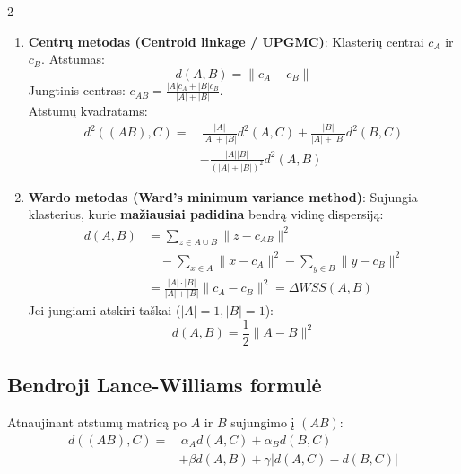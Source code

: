 \documentclass[9pt,a4paper]{article}
\begin{document}
\begin{multicols*}{2}
\begin{enumerate}
    \item \textbf{Centrų metodas (Centroid linkage / UPGMC)}:
    Klasterių centrai $c_A$ ir $c_B$. Atstumas:
    \begin{equation*}
        d(A, B) = \|c_A - c_B\|
    \end{equation*}
    Jungtinis centras: $c_{AB} = \frac{|A|c_A + |B|c_B}{|A| + |B|}$.\\
    Atstumų kvadratams:
    \begin{align*}
        d^2((AB), C) = &\,\frac{|A|}{|A|+|B|}d^2(A,C) + \frac{|B|}{|A|+|B|}d^2(B,C) \\
        & - \frac{|A||B|}{(|A|+|B|)^2}d^2(A,B)
    \end{align*}

    \item \textbf{Wardo metodas (Ward's minimum variance method)}:
    Sujungia klasterius, kurie \textbf{mažiausiai padidina} bendrą vidinę dispersiją:
    \begin{align*}
        d(A, B) &= \sum_{z \in A \cup B} \|z - c_{AB}\|^2 \\
        &\quad - \sum_{x \in A} \|x - c_A\|^2 - \sum_{y \in B} \|y - c_B\|^2 \\
        &= \frac{|A| \cdot |B|}{|A| + |B|} \|c_A - c_B\|^2 = \Delta WSS(A, B)
    \end{align*}
    Jei jungiami atskiri taškai ($|A|=1, |B|=1$):
    \begin{equation*}
        d(A, B) = \frac{1}{2}\|A - B\|^2
    \end{equation*}
\end{enumerate}

\subsection{Bendroji Lance-Williams formulė}
Atnaujinant atstumų matricą po $A$ ir $B$ sujungimo į $(AB)$:
\begin{align*}
    d((AB), C) = &\,\alpha_A d(A, C) + \alpha_B d(B, C) \\
    & + \beta d(A, B) + \gamma |d(A, C) - d(B, C)|
\end{align*}
\begin{center}
\end{center}


\end{multicols*}
\end{document}

